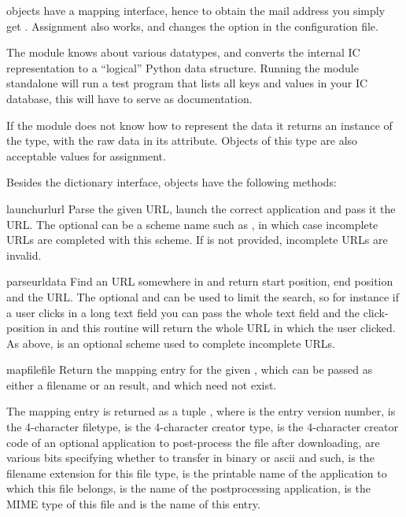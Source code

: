  objects have a mapping interface, hence to obtain the mail
address you simply get . Assignment also
works, and changes the option in the configuration file.

The module knows about various datatypes, and converts the internal IC
representation to a ``logical'' Python data structure. Running the
 module standalone will run a test program that lists all
keys and values in your IC database, this will have to serve as
documentation.

If the module does not know how to represent the data it returns an
instance of the  type, with the raw data in its
 attribute. Objects of this type are also acceptable values
for assignment.

Besides the dictionary interface,  objects have the
following methods:


\begin{methoddesc}[IC]{launchurl}{url}
Parse the given URL, launch the correct application and pass it the
URL. The optional  can be a scheme name such as
, in which case incomplete URLs are completed with this
scheme.  If  is not provided, incomplete URLs are invalid.
\end{methoddesc}

\begin{methoddesc}[IC]{parseurl}{data}
Find an URL somewhere in  and return start position, end
position and the URL. The optional  and  can be
used to limit the search, so for instance if a user clicks in a long
text field you can pass the whole text field and the click-position in
 and this routine will return the whole URL in which the
user clicked.  As above,  is an optional scheme used to
complete incomplete URLs.
\end{methoddesc}

\begin{methoddesc}[IC]{mapfile}{file}
Return the mapping entry for the given , which can be passed
as either a filename or an  result, and which
need not exist.

The mapping entry is returned as a tuple , where  is the entry version
number,  is the 4-character filetype,  is the
4-character creator type,  is the 4-character creator
code of an
optional application to post-process the file after downloading,
 are various bits specifying whether to transfer in binary
or ascii and such,  is the filename extension for this
file type,  is the printable name of the application to
which this file belongs,  is the name of the
postprocessing application,  is the MIME type of this
file and  is the name of this entry.
\end{methoddesc}


